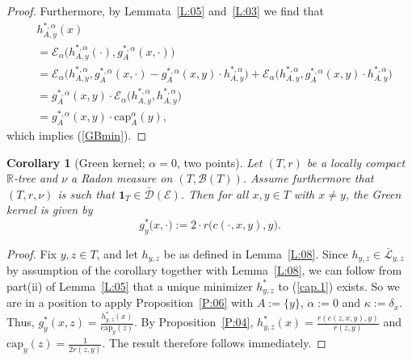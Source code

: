 \documentclass[11pt]{amsart}
\numberwithin{equation}{section}
\newtheorem{cor}[definition]{Corollary}
\begin{document}
{\begin{proof}
Furthermore, by Lemmata~\ref{L:05} and~\ref{L:03} we find that
\begin{equation}
\label{e:core.1}
\begin{aligned}
   &h^{\ast,\alpha}_{A,y}(x)
  \\
 &=
   {\mathcal E}_\alpha\big(h^{\ast,\alpha}_{A,y}(\boldsymbol{\cdot}),g_A^{\ast,\alpha}(x,{\boldsymbol{\cdot}})\big)
  \\
 &=
   {\mathcal E}_\alpha\big(h^{\ast,\alpha}_{A,y},g_A^{\ast,\alpha}(x,{\boldsymbol{\cdot}})-g_A^{\ast,\alpha}(x,y)\cdot h^{\ast,\alpha}_{A,y}\big)
   +{\mathcal E}_\alpha\big(h^{\ast,\alpha}_{A,y},g_A^{\ast,\alpha}(x,y)\cdot h^{\ast,\alpha}_{A,y}\big)
  \\
 &=
   g_A^{\ast,\alpha}(x,y)\cdot{\mathcal E}_\alpha\big(h^{\ast,\alpha}_{A,y},h^{\ast,\alpha}_{A,y}\big)
  \\
 &=
   g_A^{\ast,\alpha}(x,y)\cdot\mathrm{cap}^\alpha_A(y),
\end{aligned}
\end{equation}
which implies (\ref{GBmin}).
\end{proof}{\smallskip}

\begin{cor}[Green kernel; $\alpha=0$, two points]
 Let $(T,r)$ be a locally compact ${{\mathbb R}}$-tree
 and $\nu$ a Radon measure  on $(T,{\mathcal B}(T))$. Assume furthermore that $(T,r,\nu)$ is such that
 $\mathbf{1}_{T}\in\bar{\mathcal D}({\mathcal E})$. Then for all
 $x,y\in T$ with $x\not =y$, the Green kernel is given by \label{Cor:01}
\begin{equation}\label{GBmin2}
   g^\ast_y\big(x,\boldsymbol{\cdot}\big)
 :=
   2\cdot r\big(c(\boldsymbol{\cdot},x,y),y\big).
\end{equation}
\end{cor}{\smallskip}

\begin{proof} {Fix $y,z\in T$, and let $h_{y,z}$ be as defined in Lemma~\ref{L:08}. Since $h_{y,z}\in\bar{\mathcal L}_{y,z}$
by assumption of the corollary together with
Lemma~\ref{L:08}, we can follow from part(ii) of Lemma~\ref{L:05} that a unique minimizer $h^\ast_{y,z}$ to (\ref{cap.1}) exists.}   So we {are in a position to} apply Proposition~\ref{P:06} with $A:=\{y\}$, $\alpha:=0$ and $\kappa:=\delta_{x}$. {Thus,} $g^\ast_y(x,z)=\tfrac{h^\ast_{y,z}(x)}{\mathrm{cap}_{y}(z)}$.
By Proposition~\ref{P:04}, $h^\ast_{y,z}(x)=\frac{r(c(z,x,y),y)}{r(z,y)}$ and $\mathrm{cap}_{y}(z)=\tfrac{1}{2r(z,y)}$. The result {therefore} follows immediately.
\end{proof}{\smallskip}

}
\end{document}
